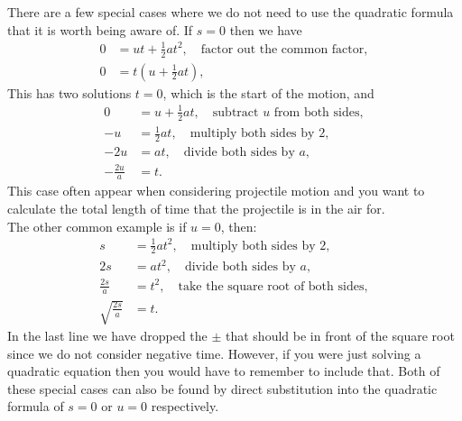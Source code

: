There are a few special cases where we do not need to use the quadratic formula that it is worth being aware of. If $s=0$ then we have
\begin{align*}
0&=ut+\frac{1}{2}at^{2}, \quad \text{factor out the common factor},\\
0&=t\left(u+\frac{1}{2}at\right),
\end{align*}
This has two solutions $t=0$, which is the start of the motion, and
\begin{align*}
0&=u+\frac{1}{2}at, \quad \text{subtract $u$ from both sides},\\
-u&=\frac{1}{2}at, \quad \text{multiply both sides by $2$},\\
-2u&=at, \quad \text{divide both sides by $a$},\\
-\frac{2u}{a}&=t.
\end{align*}
This case often appear when considering projectile motion and you want to calculate the total length of time that the projectile is in the air for.\\

The other common example is if $u=0$, then:
\begin{align*}
s&=\frac{1}{2}at^{2}, \quad \text{multiply both sides by $2$},\\
2s&=at^{2}, \quad \text{divide both sides by $a$},\\
\frac{2s}{a}&=t^{2}, \quad \text{take the square root of both sides},\\
\sqrt{\frac{2s}{a}}&=t.
\end{align*}
In the last line we have dropped the $\pm$ that should be in front of the square root since we do not consider negative time. However, if you were just solving a quadratic equation then you would have to remember to include that.  Both of these special cases can also be found by direct substitution into the quadratic formula of $s=0$ or $u=0$ respectively.\\


